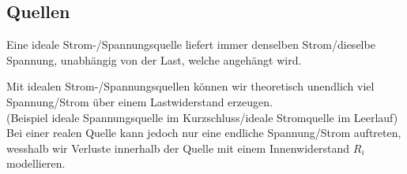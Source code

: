 										\subsection{Quellen}
										\beginip
										Eine ideale Strom-/Spannungsquelle liefert immer denselben Strom/dieselbe Spannung, unabhängig von der Last, welche angehängt wird.
										\begin{center}
										\end{center}

										\iend


										Mit idealen Strom-/Spannungsquellen können wir theoretisch unendlich viel Spannung/Strom über einem Lastwiderstand erzeugen. \\
										(Beispiel ideale Spannungsquelle im Kurzschluss/ideale Stromquelle im Leerlauf) \\
										Bei einer realen Quelle kann jedoch nur eine endliche Spannung/Strom auftreten, wesshalb wir Verluste innerhalb der Quelle mit einem Innenwiderstand $R_i$ modellieren. \\

